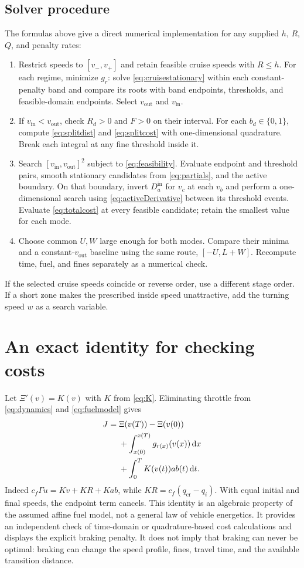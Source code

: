 \documentclass[conference,a4paper]{IEEEtran}
\newcommand{\dd}{\,\mathrm{d}}
\newcommand{\out}{\mathrm{out}}
\newcommand{\inn}{\mathrm{in}}
\newcommand{\cruise}{\mathrm{cr}}
\begin{document}
\subsection{Solver procedure}
The formulas above give a direct numerical implementation for any supplied $h$, $R$, $Q$, and penalty rates:
\begin{enumerate}
\item Restrict speeds to $[v_-,v_+]$ and retain feasible cruise speeds with $R\le h$. For each regime, minimize $g_r$: solve \eqref{eq:cruisestationary} within each constant-penalty band and compare its roots with band endpoints, thresholds, and feasible-domain endpoints. Select $v_{\out}$ and $v_{\inn}$.
\item If $v_{\inn}<v_{\out}$, check $R_d>0$ and $F>0$ on their interval. For each $b_d\in\{0,1\}$, compute \eqref{eq:splitdist} and \eqref{eq:splitcost} with one-dimensional quadrature. Break each integral at any fine threshold inside it.
\item Search $[v_{\inn},v_{\out}]^2$ subject to \eqref{eq:feasibility}. Evaluate endpoint and threshold pairs, smooth stationary candidates from \eqref{eq:partials}, and the active boundary. On that boundary, invert $D_a^{\inn}$ for $v_c$ at each $v_b$ and perform a one-dimensional search using \eqref{eq:activeDerivative} between its threshold events. Evaluate \eqref{eq:totalcost} at every feasible candidate; retain the smallest value for each mode.
\item Choose common $U,W$ large enough for both modes. Compare their minima and a constant-$v_{\out}$ baseline using the same route, $[-U,L+W]$. Recompute time, fuel, and fines separately as a numerical check.
\end{enumerate}
If the selected cruise speeds coincide or reverse order, use a different stage order. If a short zone makes the prescribed inside speed unattractive, add the turning speed $w$ as a search variable.

\section{An exact identity for checking costs}
\label{sec:identity}
Let $\Xi'(v)=K(v)$ with $K$ from \eqref{eq:K}. Eliminating throttle from \eqref{eq:dynamics} and \eqref{eq:fuelmodel} gives
\begin{align}
J={}&\Xi(v(T))-\Xi(v(0))\notag\\
&+\int_{x(0)}^{x(T)}g_{r(x)}(v(x))\dd x\notag\\
&+\int_0^T K(v(t))ab(t)\dd t.
\label{eq:identity}
\end{align}
Indeed $c_f\Gamma u=K\dot v+KR+Kab$, while $KR=c_f(q_{\cruise}-q_i)$. With equal initial and final speeds, the endpoint term cancels. This identity is an algebraic property of the assumed affine fuel model, not a general law of vehicle energetics. It provides an independent check of time-domain or quadrature-based cost calculations and displays the explicit braking penalty. It does not imply that braking can never be optimal: braking can change the speed profile, fines, travel time, and the available transition distance.
\end{document}

